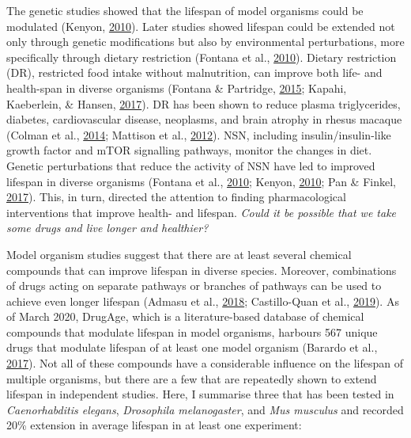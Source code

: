\documentclass[12pt,twoside]{unicam}
\begin{document}
The genetic studies showed that the lifespan of model organisms could be modulated (Kenyon, \protect\hyperlink{ref-Kenyon2010}{2010}). Later studies showed lifespan could be extended not only through genetic modifications but also by environmental perturbations, more specifically through dietary restriction (Fontana et al., \protect\hyperlink{ref-Fontana2010}{2010}). Dietary restriction (DR), restricted food intake without malnutrition, can improve both life- and health-span in diverse organisms (Fontana \& Partridge, \protect\hyperlink{ref-Fontana2015}{2015}; Kapahi, Kaeberlein, \& Hansen, \protect\hyperlink{ref-Kapahi2017}{2017}). DR has been shown to reduce plasma triglycerides, diabetes, cardiovascular disease, neoplasms, and brain atrophy in rhesus macaque (Colman et al., \protect\hyperlink{ref-Colman2014}{2014}; Mattison et al., \protect\hyperlink{ref-Mattison2012}{2012}). NSN, including insulin/insulin-like growth factor and mTOR signalling pathways, monitor the changes in diet. Genetic perturbations that reduce the activity of NSN have led to improved lifespan in diverse organisms (Fontana et al., \protect\hyperlink{ref-Fontana2010}{2010}; Kenyon, \protect\hyperlink{ref-Kenyon2010}{2010}; Pan \& Finkel, \protect\hyperlink{ref-Pan2017}{2017}). This, in turn, directed the attention to finding pharmacological interventions that improve health- and lifespan. \emph{Could it be possible that we take some drugs and live longer and healthier?}

Model organism studies suggest that there are at least several chemical compounds that can improve lifespan in diverse species. Moreover, combinations of drugs acting on separate pathways or branches of pathways can be used to achieve even longer lifespan (Admasu et al., \protect\hyperlink{ref-Admasu2018}{2018}; Castillo-Quan et al., \protect\hyperlink{ref-Castillo-Quan2019}{2019}). As of March 2020, DrugAge, which is a literature-based database of chemical compounds that modulate lifespan in model organisms, harbours 567 unique drugs that modulate lifespan of at least one model organism (Barardo et al., \protect\hyperlink{ref-Barardo2017}{2017}). Not all of these compounds have a considerable influence on the lifespan of multiple organisms, but there are a few that are repeatedly shown to extend lifespan in independent studies. Here, I summarise three that has been tested in \emph{Caenorhabditis elegans}, \emph{Drosophila melanogaster}, and \emph{Mus musculus} and recorded 20\% extension in average lifespan in at least one experiment:
\end{document}
